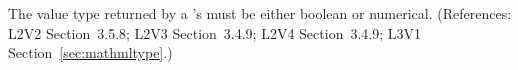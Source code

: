 The value type returned by a \FunctionDefinition's  must be
either boolean or numerical.  (References: L2V2 Section~3.5.8;
L2V3 Section~3.4.9; L2V4 Section~3.4.9; L3V1 Section~\ref{sec:mathmltype}.)
